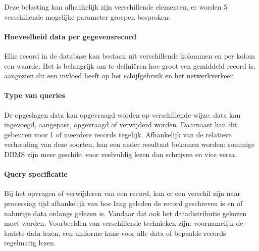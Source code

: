 \begin{figure}[h!] 
\centering
	\hfill
	\caption{}
\end{figure}
Deze belasting kan afhankelijk zijn verschillende elementen, er worden 5 verschillende mogelijke parameter groepen besproken:

\paragraph{Hoeveelheid data per gegevensrecord} Elke record in de database kan bestaan uit verschillende kolommen en per kolom een waarde. Het is belangrijk om te definiëren hoe groot een gemiddeld record is, aangezien dit een invloed heeft op het schijfgebruik en het netwerkverkeer.   

\paragraph{Type van queries} De opgeslagen data kan opgevraagd worden op verschillende wijze: data kan ingevoegd, aangepast, opgevraagd of verwijderd worden. Daarnaast kan dit gebeuren voor 1 of meerdere records tegelijk. Afhankelijk van de relatieve verhouding van deze soorten, kan een ander resultaat bekomen worden: sommige DBMS zijn meer geschikt voor veelvuldig lezen dan schrijven en vice versa. 

\paragraph{Query specificatie} Bij het opvragen of verwijderen van een record, kan er een verschil zijn naar processing tijd afhankelijk van hoe lang geleden de record geschreven is en of naburige data onlangs gelezen is. Vandaar dat ook het datadistributie gekozen moet worden. Voorbeelden van verschillende technieken zijn: voornamelijk de laatste data lezen, een uniforme kans voor alle data of bepaalde records regelmatig lezen.

